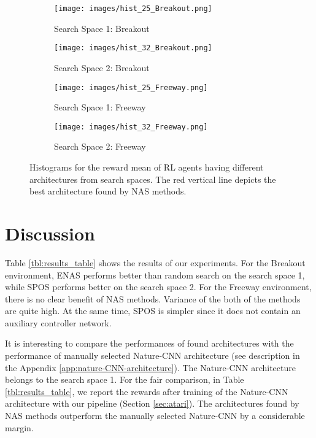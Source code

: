 \documentclass{svproc}
\begin{document}
\begin{figure}[t]
\centering
\begin{subfigure}{0.45\linewidth}
    \texttt{[image: images/hist\_25\_Breakout.png]}
    \caption{Search Space 1: Breakout}
\end{subfigure}
\hfil
\begin{subfigure}{0.45\linewidth}
    \texttt{[image: images/hist\_32\_Breakout.png]}
    \caption{Search Space 2: Breakout}
\end{subfigure}

\begin{subfigure}{0.45\linewidth}
    \texttt{[image: images/hist\_25\_Freeway.png]}
    \caption{Search Space 1: Freeway}
\end{subfigure}
\hfil
\begin{subfigure}{0.45\linewidth}
    \texttt{[image: images/hist\_32\_Freeway.png]}
    \caption{Search Space 2: Freeway}
\end{subfigure}
\caption{Histograms for the reward mean of RL agents having different architectures from search spaces. The red vertical line depicts the best architecture found by NAS methods.}
\label{fig:histograms}
\end{figure}


\section{Discussion}
Table \ref{tbl:results_table} shows the results of our experiments.
For the Breakout environment, ENAS performs better than random search on the search space 1, while SPOS performs better on the search space 2. For the Freeway environment, there is no clear benefit of NAS methods. Variance of the both of the methods are quite high.
At the same time, SPOS is simpler since it does not contain an auxiliary controller network. 


It is interesting to compare the performances of found architectures with the performance of manually selected Nature-CNN architecture \cite{Humanlevel2015} (see description in the Appendix \ref{app:nature-CNN-architecture}). The Nature-CNN architecture belongs to the search space 1. For the fair comparison, in Table \ref{tbl:results_table}, we report the rewards after training of the Nature-CNN architecture with our pipeline (Section \ref{sec:atari}). The architectures found by NAS methods outperform the manually selected Nature-CNN by a considerable margin.
\end{document}
